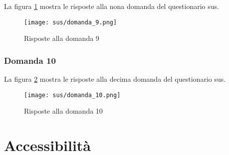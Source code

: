 \vspace{5pt}
\begin{minipage}{\textwidth}
  \noindent La figura \ref{fig:sus_q9} mostra le risposte alla nona domanda del questionario \gls{sus}.
  \begin{figure}[H]
    \centering
    \texttt{[image: sus/domanda\_9.png]}
    \caption{Risposte alla domanda 9}
    \label{fig:sus_q9}
  \end{figure}
\end{minipage}

\subsubsection*{Domanda 10}

\vspace{5pt}
\begin{minipage}{\textwidth}
  \noindent La figura \ref{fig:sus_q10} mostra le risposte alla decima domanda del questionario \gls{sus}.
  \begin{figure}[H]
    \centering
    \texttt{[image: sus/domanda\_10.png]}
    \caption{Risposte alla domanda 10}
    \label{fig:sus_q10}
  \end{figure}
\end{minipage}

\cleardoublepage

\section{Accessibilità}

